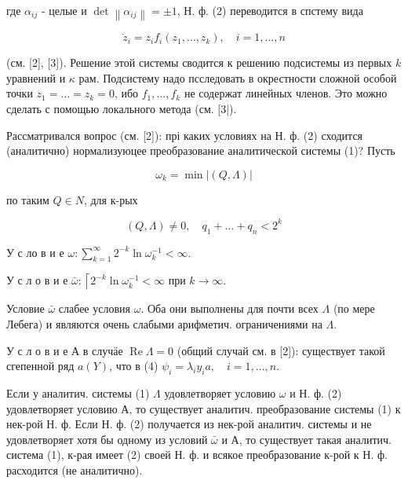 \documentclass[10pt]{article}
\begin{document}
где $\alpha_{i j}$ - целые и $\operatorname{det}\left\|\alpha_{i j}\right\|= \pm 1$, Н. ф. (2) переводится в спстему вида



\[

\dot{z}_{i}=z_{i} f_{i}\left(z_{1}, \ldots, z_{k}\right), \quad i=1, \ldots, n

\]



(см. [2], [3]). Решение этой системы сводится к решению подсистемы из первых $k$ уравнений и $\kappa$ рам. Подсистему надо псследовать в окрестности сложной особой точки $z_{1}=\ldots=z_{k}=0$, ибо $f_{1}, \ldots, f_{k}$ не содержат линейных членов. Это можно сделать с помощью локального метода (см. [3|).



Рассматривался вопрос (см. [2]): прі каких условиях на Н. ф. (2) сходится (аналитично) нормализуюцее преобразование аналитической системы (1)? Пусть



\[

\omega_{k}=\min |(Q, \Lambda)|

\]



по таким $Q \in N$, для к-рых



\[

(Q, \Lambda) \neq 0, \quad q_{1}+\ldots+q_{n}<2^{k}

\]



У с ло в и е $\omega: \sum_{k=1}^{\infty} 2^{-k} \ln \omega_{k}^{-1}<\infty$.



У с л о в и е $\bar{\omega}:\left\lceil 2^{-k} \ln \omega_{k}^{-1}<\infty\right.$ при $k \rightarrow \infty$.



Условие $\bar{\omega}$ слабее условия $\omega$. Оба они выполнены для почти всех $\Lambda$ (по мере Лебега) и являются очень слабыми арифметич. ограничениями на $\Lambda$.



У с л о в и е А в случӓе $\operatorname{Re} \Lambda=0$ (общий случай см. в [2]): существует такой сгепенной ряд $a(Y)$, что в (4) $\psi_{i}=\lambda_{i} y_{i} a, \quad i=1, \ldots, n$.



Если у аналитич. системы (1) $\Lambda$ удовлетворяет условию $\omega$ и Н. ф. (2) удовлетворяет условию А, то существует аналитич. преобразование системы (1) к нек-рой Н. ф. Если Н. ф. (2) получается из нек-рой аналитич. системы и не удовлетворяет хотя бы одному из условий $\bar{\omega}$ и А, то существует такая аналитич. система (1), к-рая имеет (2) своей Н. ф. и всякое преобразование к-рой к Н. ф. расходится (не аналитично).
\end{document}
